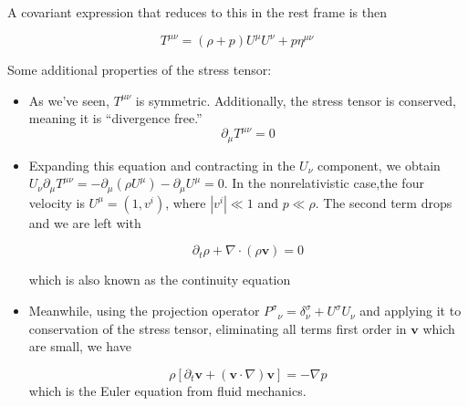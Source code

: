 \documentclass[11pt]{article}
\begin{document}
\noindent A covariant expression that reduces to this in the rest frame is then 

\[ 
    T^{\mu\nu} = (\rho + p)U^{\mu}U^{\nu} + p\eta^{\mu\nu} 
\]


\noindent Some additional properties of the stress tensor:
\begin{itemize}
    \item As we've seen, \( T^{\mu\nu}\) is symmetric. Additionally, the stress tensor is conserved, meaning it is ``divergence free.''
    \[ 
        \partial_{\mu}T^{\mu\nu} = 0 
    \]

    \item Expanding this equation and contracting in the \( U_{\nu} \) component, we obtain \( U_{\nu}\partial_{\mu}T^{\mu\nu} = -\partial_{\mu}(\rho U^{\mu}) - \partial_{\mu}U^{\mu} = 0 \).
    In the nonrelativistic case,the four velocity is \( U^{\mu}  = (1, v^{i})\), where \( |v^{i}| \ll 1 \) and \( p \ll \rho \). The second term drops and we are left with

    \[ 
        \partial_{t} \rho + \nabla \cdot (\rho \mathbf{v}) = 0
    \]

    which is also known as the continuity equation

    \item Meanwhile, using the projection operator \( P^{\sigma}{}_{\nu} = \delta^{\sigma}_\nu + U^{\sigma}U_{\nu} \) and applying it to conservation of the stress tensor, eliminating all terms first
    order in \( \mathbf{v} \) which are small, we have
    
    \[ 
        \rho\left[\partial_{t}\mathbf{v} + (\mathbf{v} \cdot \nabla)\mathbf{v}\right] = -\nabla p 
    \]
    which is the Euler equation from fluid mechanics.
\end{itemize}
\end{document}
